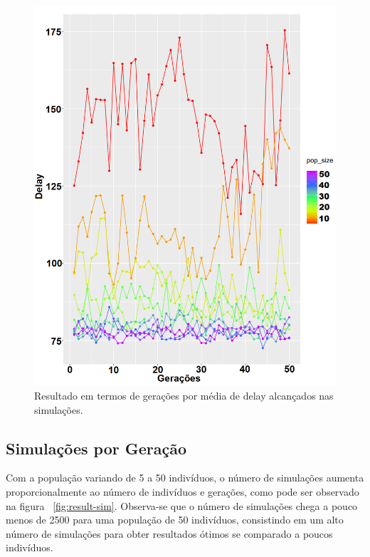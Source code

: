 \documentclass[conference]{IEEEtran}
\begin{document}
\begin{figure}[h]
  \centering
  \includegraphics[scale=0.24]{figures/GeracoesXDelay.png}
  \caption{Resultado em termos de gerações por média de delay alcançados nas simulações.}
  \label{fig:result-delay}
\end{figure}


\subsection{Simulações por Geração}

Com a população variando de 5 a 50 indivíduos, o número de simulações aumenta proporcionalmente ao número de indivíduos e gerações, como pode ser observado na figura ~\ref{fig:result-sim}. Observa-se que o número de simulações chega a pouco menos de 2500 para uma população de 50 indivíduos, consistindo em um alto número de simulações para obter resultados ótimos se comparado a poucos indivíduos.
\end{document}
